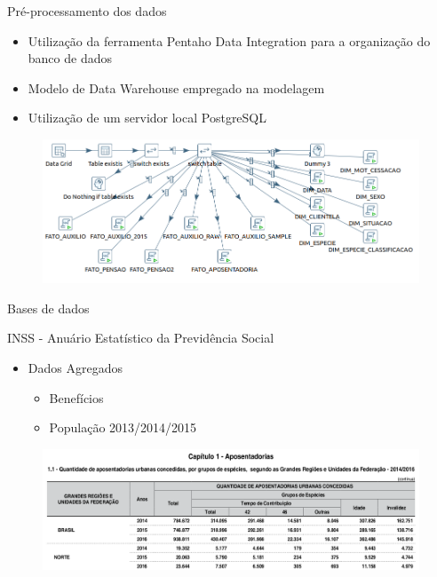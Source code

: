 \begin{frame}
  \begin{block}{Pré-processamento dos dados}
    \begin{itemize}
      \item Utilização da ferramenta \alert{Pentaho Data Integration} para a organização do banco de dados
      \item Modelo de \alert{Data Warehouse} empregado na modelagem
      \item Utilização de um servidor local PostgreSQL 
    \end{itemize}
  \end{block}
  
  \begin{figure}[h]
  	\begin{center}
      \includegraphics [scale=0.34]{./Figures/etl}
  	\end{center}
  \end{figure}
\end{frame}

\begin{frame}{Bases de dados}
  \begin{block}{INSS - Anuário Estatístico da Previdência Social}
    \begin{itemize}
      \item Dados Agregados
      \begin{itemize}
        \item Benefícios
        \item População 2013/2014/2015
      \end{itemize}
    \end{itemize}
  \end{block}
  \begin{figure}[h]
  	\begin{center}
      \includegraphics [scale=0.27]{./Figures/aeps01}
  	\end{center}
  \end{figure}
\end{frame}

